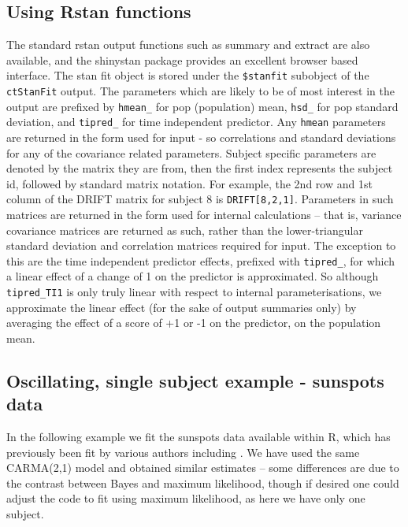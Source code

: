 \documentclass[11pt]{article}\usepackage[]{graphicx}\usepackage[]{color}
\begin{document}
{{{\subsection{Using Rstan functions}
The standard rstan output functions such as summary and extract are also available, and the shinystan package provides an excellent browser based interface. The stan fit object is stored under the \verb|$stanfit| subobject of the \verb|ctStanFit| output. The parameters which are likely to be of most interest in the output are prefixed by \verb|hmean_| for pop (population) mean, \verb|hsd_| for pop standard deviation, and \verb|tipred_| for time independent predictor. Any \verb|hmean| parameters are returned in the form used for input - so correlations and standard deviations for any of the covariance related parameters. Subject specific parameters are denoted by the matrix they are from, then the first index represents the subject id, followed by standard matrix notation. For example, the 2nd row and 1st column of the DRIFT matrix for subject 8 is \verb|DRIFT[8,2,1]|. Parameters in such matrices are returned in the form used for internal calculations -- that is, variance covariance matrices are returned as such, rather than the lower-triangular standard deviation and correlation matrices required for input. The exception to this are the time independent predictor effects, prefixed with \verb|tipred_|, for which a linear effect of a change of 1 on the predictor is approximated. So although \verb|tipred_TI1| is only truly linear with respect to internal parameterisations, we approximate the linear effect (for the sake of output summaries only) by averaging the effect of a score of +1 or -1 on the predictor, on the population mean. 


\subsection{Oscillating, single subject example - sunspots data}
In the following example we fit the sunspots data available within R, which has previously been fit by various authors including \citet{tomasson2013computational}. We have used the same CARMA(2,1) model and obtained similar estimates -- some differences are due to the contrast between Bayes and maximum likelihood, though if desired one could adjust the code to fit using maximum likelihood, as here we have only one subject. 



}}}
\end{document}
